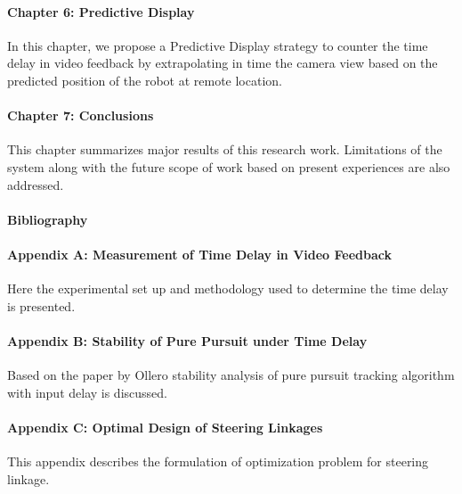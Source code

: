 \paragraph*{Chapter 6: Predictive Display \\}
In this chapter,  we propose a Predictive Display strategy to counter the time delay in video feedback by extrapolating in time  the camera view based on the predicted position of the robot at remote location. 

\paragraph*{Chapter 7: Conclusions\\}
This chapter summarizes major results of this research work. Limitations of the system along with the future scope of work based on present experiences are also addressed.


\paragraph*{Bibliography}
\paragraph*{Appendix A:  Measurement of Time Delay in Video Feedback  \\}
Here the experimental set up and methodology used to determine the time delay is presented.
\paragraph*{Appendix B:  Stability of Pure Pursuit  under Time Delay \\}
Based on the paper by Ollero \cite{ollero1995stability} stability analysis of pure pursuit tracking algorithm with input delay is discussed.
\paragraph*{Appendix C:  Optimal Design of Steering Linkages \\} 
This appendix describes the formulation of optimization problem for steering linkage.